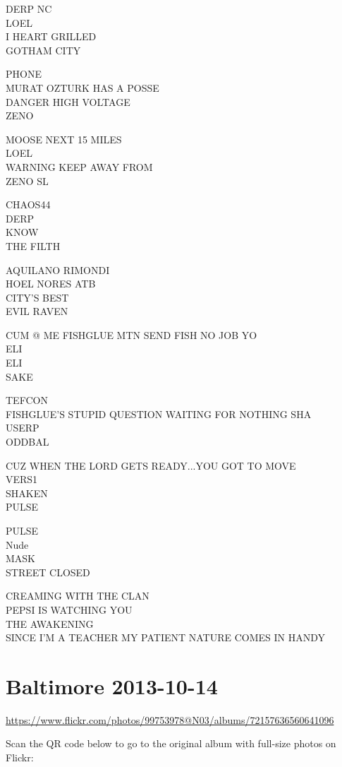 \documentclass[10pt,letterpaper]{article}
\begin{document}
DERP NC\\
LOEL\\
I HEART GRILLED\\
GOTHAM CITY

PHONE\\
MURAT OZTURK HAS A POSSE\\
DANGER HIGH VOLTAGE\\
ZENO

MOOSE NEXT 15 MILES\\
LOEL\\
WARNING KEEP AWAY FROM\\
ZENO SL

CHAOS44\\
DERP\\
KNOW\\
THE FILTH

AQUILANO RIMONDI\\
HOEL NORES ATB\\
CITY'S BEST\\
EVIL RAVEN

CUM @ ME FISHGLUE MTN SEND FISH NO JOB YO\\
ELI\\
ELI\\
SAKE

TEFCON\\
FISHGLUE'S STUPID QUESTION WAITING FOR NOTHING SHA\\
USERP\\
ODDBAL

CUZ WHEN THE LORD GETS READY...YOU GOT TO MOVE\\
VERS1\\
SHAKEN\\
PULSE

PULSE\\
Nude\\
MASK\\
STREET CLOSED

CREAMING WITH THE CLAN\\
PEPSI IS WATCHING YOU\\
THE AWAKENING\\
SINCE I'M A TEACHER MY PATIENT NATURE COMES IN HANDY


\section*{Baltimore 2013-10-14}

\url{https://www.flickr.com/photos/99753978@N03/albums/72157636560641096}

Scan the QR code below to go to the original album with full-size photos on Flickr:
\end{document}
